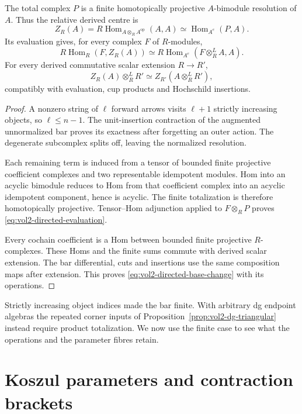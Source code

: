 \begin{theorem}\label{thm:vol2-directed-bar}
The total complex $P$ is a finite homotopically projective
$A$-bimodule resolution of $A$. Thus the relative derived centre is
\[
 Z_R(A)=R\operatorname{Hom}_{A\otimes_RA^{\mathrm{op}}}(A,A)
          \simeq\operatorname{Hom}_{A^e}(P,A).
\]
Its evaluation gives, for every complex $F$ of $R$-modules,
\begin{equation}\label{eq:vol2-directed-evaluation}
 R\operatorname{Hom}_R(F,Z_R(A))
 \simeq R\operatorname{Hom}_{A^e}(F\otimes_R^LA,A).
\end{equation}
For every derived commutative scalar extension $R\to R'$,
\begin{equation}\label{eq:vol2-directed-base-change}
 Z_R(A)\otimes_R^LR'
       \simeq Z_{R'}(A\otimes_R^LR'),
\end{equation}
compatibly with evaluation, cup products and Hochschild insertions.
\end{theorem}
\begin{proof}
A nonzero string of $\ell$ forward arrows visits $\ell+1$
strictly increasing objects, so $\ell\leq n-1$.
The unit-insertion contraction of the augmented unnormalized
bar proves its exactness after forgetting an outer action.
The degenerate subcomplex splits off, leaving the normalized
resolution.

Each remaining term is induced from a tensor of bounded finite
projective coefficient complexes and two representable
idempotent modules. Hom into an acyclic bimodule reduces to
Hom from that coefficient complex into an acyclic idempotent
component, hence is acyclic. The finite totalization is therefore
homotopically projective. Tensor--Hom adjunction applied to
$F\otimes_RP$ proves \eqref{eq:vol2-directed-evaluation}.

Every cochain coefficient is a Hom between bounded finite
projective $R$-complexes. These Homs and the finite sums commute
with derived scalar extension. The bar differential, cuts and
insertions use the same composition maps after extension.
This proves \eqref{eq:vol2-directed-base-change} with its operations.
\end{proof}

Strictly increasing object indices made the bar finite.
With arbitrary dg endpoint algebras the repeated corner inputs
of Proposition~\ref{prop:vol2-dg-triangular} instead require
product totalization. We now use the finite case to see what
the operations and the parameter fibres retain.

\section{Koszul parameters and contraction brackets}
\label{sec:vol2-koszul-interface}

